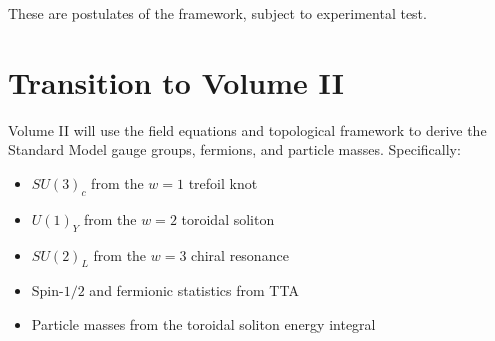 \documentclass[12pt,oneside]{book}
\begin{document}
These are postulates of the framework, subject to experimental test.

\section{Transition to Volume II}

Volume II will use the field equations and topological framework to derive the Standard Model gauge groups, fermions, and particle masses. Specifically:
\begin{itemize}
    \item $SU(3)_c$ from the $w=1$ trefoil knot
    \item $U(1)_Y$ from the $w=2$ toroidal soliton
    \item $SU(2)_L$ from the $w=3$ chiral resonance
    \item Spin-$1/2$ and fermionic statistics from TTA
    \item Particle masses from the toroidal soliton energy integral
\end{itemize}
\end{document}
